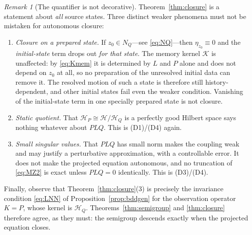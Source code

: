 \documentclass[11pt,reqno]{amsart}
\numberwithin{equation}{section}
\theoremstyle{plain}
\theoremstyle{definition}
\theoremstyle{remark}
\newtheorem{remark}[theorem]{Remark}
\newcommand{\HP}{\mathcal{H}_{P}}
\newcommand{\HQ}{\mathcal{H}_{Q}}
\newcommand{\Kmem}{\mathcal{K}}
\begin{document}
\begin{remark}[The quantifier is not decorative]
\label{rem:quantifier}
Theorem~\ref{thm:closure} is a statement about \emph{all} source states. Three distinct
weaker phenomena must not be mistaken for autonomous closure:
\begin{enumerate}
\item \emph{Closure on a prepared state.} If $z_{0}\in N_{Q}$---see \eqref{eq:NQ}---then
$\eta_{z_{0}}\equiv0$ and the \emph{initial-state} term drops out \emph{for that state}. The
memory kernel $\Kmem$ is unaffected: by \eqref{eq:Kmem} it is determined by $L$ and $P$ alone
and does not depend on $z_{0}$ at all, so no preparation of the unresolved initial data can
remove it. The resolved motion of such a state is therefore still history-dependent, and other
initial states fail even the weaker condition. Vanishing of the initial-state term in one
specially prepared state is not closure.
\item \emph{Static quotient.} That $\HP\cong\mathcal{H}/\HQ$ is a perfectly good Hilbert
space says nothing whatever about $PLQ$. This is (D1)/(D4) again.
\item \emph{Small singular values.} That $PLQ$ has small norm makes the coupling weak and
may justify a perturbative approximation, with a controllable error. It does not make the
projected equation autonomous, and no truncation of \eqref{eq:MZ2} is exact unless
$PLQ=0$ identically. This is (D3)/(D4).
\end{enumerate}
Finally, observe that Theorem~\ref{thm:closure}(3) is precisely the invariance condition
\eqref{eq:LNN} of Proposition~\ref{prop:bddgen} for the observation operator $K=P$, whose
kernel is $\HQ$. Theorems~\ref{thm:semigroup} and \ref{thm:closure} therefore agree, as they
must: the semigroup descends exactly when the projected equation closes.
\end{remark}
\end{document}
